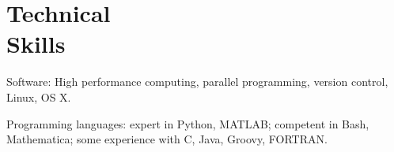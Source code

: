 \section{\sc Technical\\Skills} %
\begin{list2}
\item Software: High performance computing, parallel programming, version control, Linux, OS X.
\item Programming languages: expert in Python, MATLAB; competent in Bash, Mathematica; some experience with C, Java, Groovy, FORTRAN.
\end{list2}

